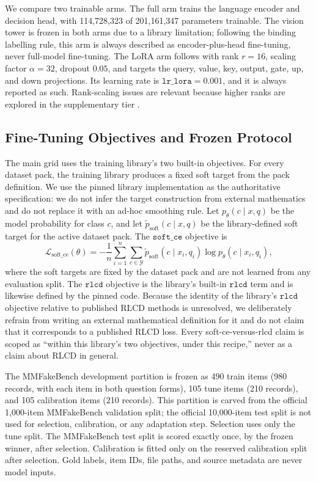 \documentclass{article} %
\begin{document}
We compare two trainable arms. The full arm trains the language encoder and decision head, with 114,728,323 of 201,161,347 parameters trainable. The vision tower is frozen in both arms due to a library limitation; following the binding labelling rule, this arm is always described as encoder-plus-head fine-tuning, never full-model fine-tuning. The LoRA arm follows \citet{Hu2021LoraLowrank} with rank \(r=16\), scaling factor \( \alpha=32\), dropout \(0.05\), and targets the query, value, key, output, gate, up, and down projections. Its learning rate is \( \texttt{lr\_lora}=0.001\), and it is always reported as such. Rank-scaling issues are relevant because higher ranks are explored in the supplementary tier \citep{Kalajdzievski2023RankStabilization}.

\subsection{Fine-Tuning Objectives and Frozen Protocol}
The main grid uses the training library's two built-in objectives. For every dataset pack, the training library produces a fixed soft target from the pack definition. We use the pinned library implementation as the authoritative specification: we do not infer the target construction from external mathematics and do not replace it with an ad-hoc smoothing rule. Let \(p_\theta(c\mid x,q)\) be the model probability for class \(c\), and let \(\tilde{p}_{\mathrm{soft}}(c\mid x,q)\) be the library-defined soft target for the active dataset pack. The \( \texttt{soft\_ce} \) objective is
\[
\mathcal{L}_{\mathrm{soft\_ce}}(\theta)
=
-\frac{1}{n}
\sum_{i=1}^{n}
\sum_{c\in\mathcal{Y}}
\tilde{p}_{\mathrm{soft}}(c\mid x_i,q_i)
\log p_\theta(c\mid x_i,q_i),
\]
where the soft targets are fixed by the dataset pack and are not learned from any evaluation split. The \( \texttt{rlcd} \) objective is the library's built-in \( \texttt{rlcd} \) term and is likewise defined by the pinned code. Because the identity of the library's \( \texttt{rlcd} \) objective relative to published RLCD methods is unresolved, we deliberately refrain from writing an external mathematical definition for it and do not claim that it corresponds to a published RLCD loss. Every soft-ce-versus-rlcd claim is scoped as ``within this library's two objectives, under this recipe,'' never as a claim about RLCD in general.

The MMFakeBench development partition is frozen as 490 train items (980 records, with each item in both question forms), 105 tune items (210 records), and 105 calibration items (210 records). This partition is carved from the official 1,000-item MMFakeBench validation split; the official 10,000-item test split is not used for selection, calibration, or any adaptation step. Selection uses only the tune split. The MMFakeBench test split is scored exactly once, by the frozen winner, after selection. Calibration is fitted only on the reserved calibration split after selection. Gold labels, item IDs, file paths, and source metadata are never model inputs.
\end{document}

